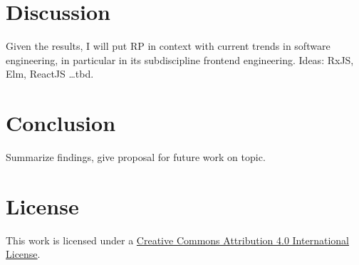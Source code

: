 \documentclass[12pt,a4paper]{article}
\begin{document}
\section{Discussion}
Given the results, I will put RP in context with current trends in software engineering, in particular in its subdiscipline frontend engineering.
Ideas: RxJS, Elm, ReactJS \dots tbd.

\section{Conclusion}
Summarize findings, give proposal for future work on topic.




\section*{License}
\ccby\thinspace\thinspace This work is licensed under a \href{https://creativecommons.org/licenses/by/4.0/}{Creative Commons Attribution 4.0 International License}.
\end{document}
